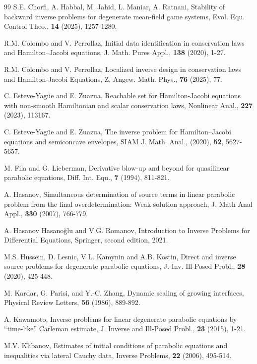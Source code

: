 \documentclass[reqno]{amsart}
\theoremstyle{plain}
\theoremstyle{remark}
\numberwithin{equation}{section}
\begin{document}
\begin{thebibliography}{99}
 S.E. Chorfi, A. Habbal, M. Jahid, L. Maniar, A. Ratnani, Stability of backward inverse problems for degenerate mean-field game systems, Evol. Equ. Control Theo., \textbf{14} (2025), 1257-1280.

 R.M. Colombo and V. Perrollaz, Initial data identification in conservation laws and Hamilton–Jacobi equations, J. Math. Pures Appl., \textbf{138} (2020), 1-27.

 R.M. Colombo and V. Perrollaz, Localized inverse design in conservation laws and Hamilton-Jacobi Equations, Z. Angew. Math. Phys., \textbf{76} (2025), 77.

 C. Esteve-Yagüe and E. Zuazua, Reachable set for Hamilton-Jacobi equations with non-smooth Hamiltonian and scalar conservation laws, Nonlinear Anal., \textbf{227} (2023), 113167.

C. Esteve-Yagüe and E. Zuazua, The inverse problem for Hamilton--Jacobi equations and semiconcave envelopes, SIAM J. Math. Anal., (2020), {\bf 52}, 5627-5657.

M. Fila and G. Lieberman, Derivative blow-up and beyond for quasilinear parabolic equations, Diff. Int. Equ., \textbf{7} (1994), 811-821.

 A. Hasanov, Simultaneous determination of source terms in linear parabolic problem from the final overdetermination: Weak solution approach, J. Math Anal Appl., \textbf{330} (2007), 766-779.

 A. Hasanov Hasanoğlu and V.G. Romanov, Introduction to Inverse Problems for Differential Equations, Springer, second edition, 2021.

M.S. Hussein, D. Lesnic, V.L. Kamynin and A.B. Kostin, Direct and inverse source problems for degenerate parabolic equations, J. Inv. Ill-Posed Probl., \textbf{28} (2020), 425-448.

 M. Kardar, G. Parisi, and Y.-C. Zhang, Dynamic scaling of growing interfaces, Physical Review Letters, \textbf{56} (1986), 889-892.

A. Kawamoto, Inverse problems for linear degenerate parabolic equations by ``time-like” Carleman estimate, J. Inverse and Ill-Posed Probl., {\bf 23} (2015), 1-21.

 M.V. Klibanov, Estimates of initial conditions of parabolic equations and inequalities via lateral Cauchy data, Inverse Problems, \textbf{22} (2006), 495-514.


\end{thebibliography}
\end{document}
